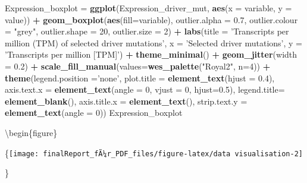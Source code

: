 \documentclass[]{article}
\newenvironment{Shaded}{\begin{snugshade}}{\end{snugshade}}
\newcommand{\DataTypeTok}[1]{\textcolor[rgb]{0.13,0.29,0.53}{#1}}
\newcommand{\DecValTok}[1]{\textcolor[rgb]{0.00,0.00,0.81}{#1}}
\newcommand{\FloatTok}[1]{\textcolor[rgb]{0.00,0.00,0.81}{#1}}
\newcommand{\KeywordTok}[1]{\textcolor[rgb]{0.13,0.29,0.53}{\textbf{#1}}}
\newcommand{\NormalTok}[1]{#1}
\newcommand{\OperatorTok}[1]{\textcolor[rgb]{0.81,0.36,0.00}{\textbf{#1}}}
\newcommand{\StringTok}[1]{\textcolor[rgb]{0.31,0.60,0.02}{#1}}
\begin{document}
\begin{Shaded}
\begin{Highlighting}[]
\NormalTok{Expression_boxplot =}\StringTok{ }\KeywordTok{ggplot}\NormalTok{(Expression_driver_mut, }\KeywordTok{aes}\NormalTok{(}\DataTypeTok{x =}\NormalTok{ variable, }\DataTypeTok{y =}\NormalTok{ value)) }\OperatorTok{+}
\StringTok{       }\KeywordTok{geom_boxplot}\NormalTok{(}\KeywordTok{aes}\NormalTok{(}\DataTypeTok{fill=}\NormalTok{variable), }\DataTypeTok{outlier.alpha =} \FloatTok{0.7}\NormalTok{,}
                     \DataTypeTok{outlier.colour =} \StringTok{"grey"}\NormalTok{, }\DataTypeTok{outlier.shape =} \DecValTok{20}\NormalTok{, }\DataTypeTok{outlier.size =} \DecValTok{2}\NormalTok{) }\OperatorTok{+}
\StringTok{        }\KeywordTok{labs}\NormalTok{(}\DataTypeTok{title =} \StringTok{'Transcripts per million (TPM) of selected driver mutations'}\NormalTok{, }\DataTypeTok{x =} \StringTok{'Selected driver mutations'}\NormalTok{, }\DataTypeTok{y =} \StringTok{'Transcripts per million [TPM]'}\NormalTok{) }\OperatorTok{+}
\StringTok{            }\KeywordTok{theme_minimal}\NormalTok{() }\OperatorTok{+}
\StringTok{            }\KeywordTok{geom_jitter}\NormalTok{(}\DataTypeTok{width =} \FloatTok{0.2}\NormalTok{) }\OperatorTok{+}
\StringTok{            }\KeywordTok{scale_fill_manual}\NormalTok{(}\DataTypeTok{values=}\KeywordTok{wes_palette}\NormalTok{(}\StringTok{"Royal2"}\NormalTok{, }\DataTypeTok{n=}\DecValTok{4}\NormalTok{)) }\OperatorTok{+}
\StringTok{            }\KeywordTok{theme}\NormalTok{(}\DataTypeTok{legend.position =}\StringTok{'none'}\NormalTok{,}
                  \DataTypeTok{plot.title =} \KeywordTok{element_text}\NormalTok{(}\DataTypeTok{hjust =} \FloatTok{0.4}\NormalTok{),}
                  \DataTypeTok{axis.text.x =} \KeywordTok{element_text}\NormalTok{(}\DataTypeTok{angle =} \DecValTok{0}\NormalTok{, }\DataTypeTok{vjust =} \DecValTok{0}\NormalTok{, }\DataTypeTok{hjust=}\FloatTok{0.5}\NormalTok{),}
                  \DataTypeTok{legend.title=} \KeywordTok{element_blank}\NormalTok{(),}
                  \DataTypeTok{axis.title.x =} \KeywordTok{element_text}\NormalTok{(),}
                  \DataTypeTok{strip.text.y =} \KeywordTok{element_text}\NormalTok{(}\DataTypeTok{angle =} \DecValTok{0}\NormalTok{))}
\NormalTok{Expression_boxplot}
\end{Highlighting}
\end{Shaded}

\textbackslash begin\{figure\}

\{\centering \texttt{[image: finalReport\_fÃ¼r\_PDF\_files/figure-latex/data visualisation-2]}

\}
\end{document}
